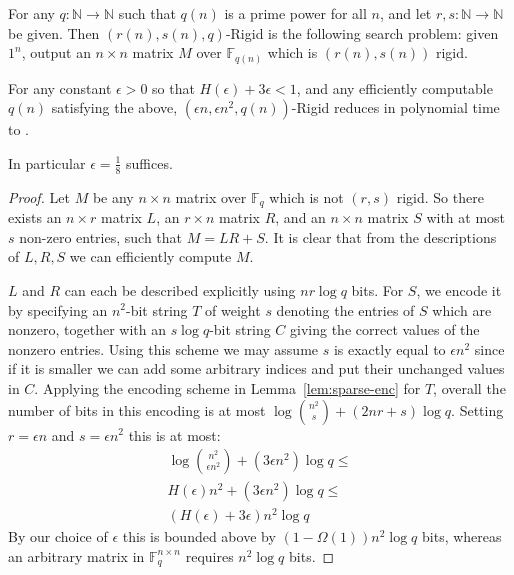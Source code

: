 \begin{definition}\label{range:def:rigid-search-problem}
For any $q: \mathbb{N} \rightarrow \mathbb{N}$ such that $q(n)$ is a prime power for all $n$, and let $r, s: \mathbb{N} \to \mathbb{N}$ be given. Then {\sc $(r(n), s(n), q)$-Rigid} is the following search problem: given $1^n$, output an $n \times n$ matrix $M$ over $\mathbb{F}_{q(n)}$ which is $(r(n), s(n))$ rigid.
\end{definition}
\begin{theorem}\label{thm:rigid-in-apepp}
For any constant $\epsilon>0$ so that $H(\epsilon) + 3\epsilon < 1$, and any efficiently computable $q(n)$ satisfying the above, {\sc $(\epsilon n, \epsilon n^2, q(n))$-Rigid} reduces in polynomial time to \avoid.
\end{theorem}
In particular $\epsilon = \frac{1}{8}$ suffices.
\begin{proof}
Let $M$ be any $n \times n$ matrix over $\mathbb{F}_q$ which is not $(r,s)$ rigid. So there exists an $n \times r$ matrix $L$, an $r \times n$ matrix $R$, and an $n \times n$ matrix $S$ with at most $s$ non-zero entries, such that $M = LR + S$. It is clear that from the descriptions of $L,R,S$ we can efficiently compute $M$.

$L$ and $R$ can each be described explicitly using $nr \log q$ bits. For $S$, we encode it by specifying an $n^2$-bit string $T$ of weight $s$ denoting the entries of $S$ which are nonzero, together with an $s \log q$-bit string $C$ giving the correct values of the nonzero entries. Using this scheme we may assume $s$ is exactly equal to $\epsilon n^2$ since if it is smaller we can add some arbitrary indices and put their unchanged values in $C$. Applying the encoding scheme in Lemma~\ref{lem:sparse-enc} for $T$, overall the number of bits in this encoding is at most $\log\binom{n^2}{s} + (2nr + s)\log q$. Setting $r = \epsilon n$ and $s= \epsilon n^2$ this is at most:
\begin{gather*}
\log\binom{n^2}{\epsilon n^2} + (3\epsilon n^2)\log q
 \leq \\
H(\epsilon)n^2 + (3 \epsilon n^2)\log q \leq \\
(H(\epsilon) + 3\epsilon)n^2\log q
\end{gather*}
By our choice of $\epsilon$ this is bounded above by $(1- \Omega(1))n^2\log q$ bits, whereas an arbitrary matrix in  $\mathbb{F}_q^{n \times n}$ requires $n^2\log q$ bits.
\end{proof}

